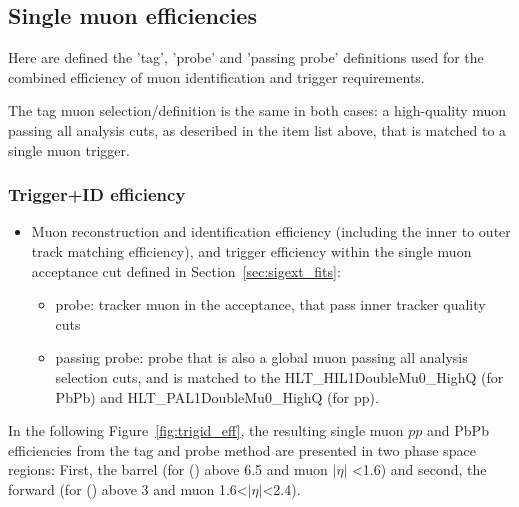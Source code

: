 \subsection{Single muon efficiencies}
\label{sec:tnp_mueff}

Here are defined the 'tag', 'probe' and 'passing probe' definitions used for
the combined efficiency of muon identification and trigger
requirements.%

The
tag muon selection/definition is the same in both cases: a
high-quality muon passing all analysis cuts, as described in the item
list above, that is matched to a single muon trigger. 

\subsubsection*{Trigger+ID efficiency}
\label{subsec:def_trigID}
\begin{itemize}
\item Muon reconstruction and identification efficiency (including the
  inner to outer track matching efficiency), and trigger efficiency within the single muon acceptance cut defined in Section~\ref{sec:sigext_fits}:
  \begin{itemize}
  \item probe: tracker muon in the acceptance, that pass inner tracker quality cuts
   \item passing probe: probe that is also a global muon passing all analysis selection cuts, and is matched to the HLT\_HIL1DoubleMu0\_HighQ (for PbPb) and HLT\_PAL1DoubleMu0\_HighQ (for pp).
   \end{itemize}
\end{itemize}
In the following Figure~\ref{fig:trigid_eff}, the resulting
single muon $pp$ and PbPb efficiencies from the tag and probe method are
presented in two phase space regions: First, the barrel (for
\pt(\Jpsi) above 6.5 \GeVc and muon $|\eta|$ <1.6) and second,
the forward (for \pt(\Jpsi) above 3 \GeVc and muon 1.6<$|\eta|$<2.4).

